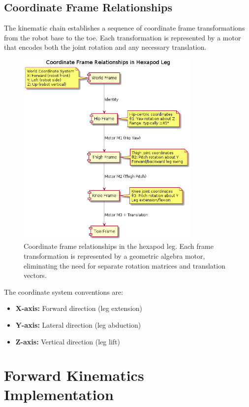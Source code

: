 \documentclass[11pt]{article}
\begin{document}
\subsection{Coordinate Frame Relationships}

The kinematic chain establishes a sequence of coordinate frame transformations from the robot base to the toe. Each transformation is represented by a motor that encodes both the joint rotation and any necessary translation.

\begin{figure}[H]
    \centering
    \includegraphics[width=0.8\textwidth]{illustrations/coordinate_frames.png}
    \caption{Coordinate frame relationships in the hexapod leg. Each frame transformation is represented by a geometric algebra motor, eliminating the need for separate rotation matrices and translation vectors.}
    \label{fig:coordinate_frames}
\end{figure}

The coordinate system conventions are:
\begin{itemize}
    \item \textbf{X-axis:} Forward direction (leg extension)
    \item \textbf{Y-axis:} Lateral direction (leg abduction)  
    \item \textbf{Z-axis:} Vertical direction (leg lift)
\end{itemize}

\section{Forward Kinematics Implementation}
\end{document}
